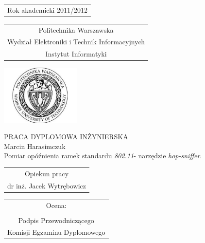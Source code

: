 \thispagestyle{empty}

\begin{flushright}
 \begin{tabular}{c}
  Rok akademicki 2011/2012
 \end{tabular}
\end{flushright}

\begin{flushleft}
 \begin{tabular}{c}
  Politechnika Warszawska \\
  Wydział Elektroniki i Technik Informacyjnych \\
  Instytut Informatyki
 \end{tabular}
\end{flushleft}

\vspace{24pt}

\begin{center}
 \includegraphics[width=0.3\textwidth]{img/pw_logo.pdf}
\end{center}

\vspace{12pt}

\begin{center}
 {\Large PRACA DYPLOMOWA INŻYNIERSKA}\\
 \vspace{24pt}
 {\large Marcin Harasimczuk}\\
 \vspace{24pt}
 {\LARGE Pomiar opóźnienia ramek standardu \emph{802.11}- narzędzie \emph{hop-sniffer}.}\\
\end{center}

\vfill

\begin{flushright}
 \begin{tabular}{c}
  Opiekun pracy \\
  dr inż. Jacek Wytrębowicz
 \end{tabular}
\end{flushright}

\vspace{12pt}

\begin{flushleft}
 \begin{tabular}{c}
  Ocena:\dotfill \\ \addlinespace[18pt]
  \dotfill \\
  Podpis Przewodniczącego \\
  Komisji Egzaminu Dyplomowego
 \end{tabular}
\end{flushleft}

